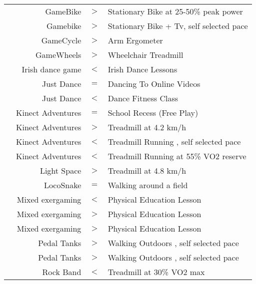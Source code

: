 {\begin{tabular}{lrcl}
\cite{Warburton2009MetabolicCycling}&GameBike&\cellcolor{green!30}$>$&Stationary Bike at 25-50\% peak power\\
\cite{Kraft2011HeartParticipants}&Gamebike&\cellcolor{green!30}$>$&Stationary Bike + Tv, self selected pace\\
\cite{Fitzgerald2004TheErgometry}&GameCycle&\cellcolor{green!30}$>$&Arm Ergometer\\
\cite{OConnor2002KineticSystem}&GameWheels&\cellcolor{green!30}$>$&Wheelchair Treadmill\\
\cite{Rincker2017TheFitness}&Irish dance game&\cellcolor{red!30}$<$&Irish Dance Lessons\\
\cite{Lin2015JustOutcomes}&Just Dance&\cellcolor{yellow!30}$=$&Dancing To Online Videos\\
\cite{eason2016comparison}&Just Dance&\cellcolor{red!30}$<$&Dance Fitness Class\\
\cite{Vallabhajosula2016EffectStudy}&Kinect Adventures&\cellcolor{yellow!30}$=$&School Recess (Free Play)\\
\cite{Lisn2015CompetitiveAdolescents}&Kinect Adventures&\cellcolor{green!30}$>$&Treadmill at 4.2 km/h\\
\cite{Monedero2017EnergyExercise}&Kinect Adventures&\cellcolor{red!30}$<$&Treadmill Running , self selected pace\\
\cite{Monedero2017EnergyExercise}&Kinect Adventures&\cellcolor{red!30}$<$&Treadmill Running  at 55\% VO2 reserve\\
\cite{Bailey2011EnergyExergaming}&Light Space&\cellcolor{green!30}$>$&Treadmill at 4.8 km/h\\
\cite{Chittaro2012TurningWalking}&LocoSnake&\cellcolor{yellow!30}$=$&Walking around a field\\
\cite{Sun2012ExergamingChildren}&Mixed exergaming&\cellcolor{red!30}$<$&Physical Education Lesson\\
\cite{Fogel2010TheClassroom}&Mixed exergaming&\cellcolor{green!30}$>$&Physical Education Lesson\\
\cite{Shayne2012TheClass}&Mixed exergaming&\cellcolor{green!30}$>$&Physical Education Lesson\\
\cite{Hagen2016GameplayExercise}&Pedal Tanks&\cellcolor{green!30}$>$&Walking Outdoors , self selected pace\\
\cite{Moholdt2017ExergamingTraining}&Pedal Tanks&\cellcolor{green!30}$>$&Walking Outdoors , self selected pace\\
\cite{miranda2017energy}&Rock Band&\cellcolor{red!30}$<$&Treadmill at 30\% VO2 max\\

\end{tabular}}
